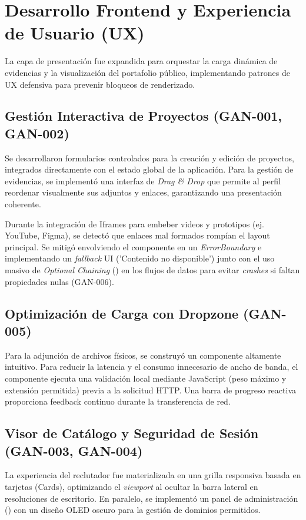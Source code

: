 \section{Desarrollo Frontend y Experiencia de Usuario (UX)}
\label{sec:frontend_sprint3}

La capa de presentación fue expandida para orquestar la carga dinámica de evidencias y la visualización del portafolio público, implementando patrones de UX defensiva para prevenir bloqueos de renderizado.

\subsection{Gestión Interactiva de Proyectos (GAN-001, GAN-002)}
Se desarrollaron formularios controlados para la creación y edición de proyectos, integrados directamente con el estado global de la aplicación. Para la gestión de evidencias, se implementó una interfaz de \textit{Drag \& Drop} que permite al perfil reordenar visualmente sus adjuntos y enlaces, garantizando una presentación coherente.

\begin{AlertaDefecto}
Durante la integración de Iframes para embeber videos y prototipos (ej. YouTube, Figma), se detectó que enlaces mal formados rompían el layout principal. Se mitigó envolviendo el componente en un \textit{ErrorBoundary} e implementando un \textit{fallback} UI ('Contenido no disponible') junto con el uso masivo de \textit{Optional Chaining} () en los flujos de datos para evitar \textit{crashes} si faltan propiedades nulas (GAN-006).
\end{AlertaDefecto}

\subsection{Optimización de Carga con Dropzone (GAN-005)}
Para la adjunción de archivos físicos, se construyó un componente  altamente intuitivo. Para reducir la latencia y el consumo innecesario de ancho de banda, el componente ejecuta una validación local mediante JavaScript (peso máximo y extensión permitida) previa a la solicitud HTTP. Una barra de progreso reactiva proporciona feedback continuo durante la transferencia de red.

\subsection{Visor de Catálogo y Seguridad de Sesión (GAN-003, GAN-004)}
La experiencia del reclutador fue materializada en una grilla responsiva basada en tarjetas (Cards), optimizando el \textit{viewport} al ocultar la barra lateral en resoluciones de escritorio. En paralelo, se implementó un panel de administración () con un diseño OLED oscuro para la gestión de dominios permitidos.


